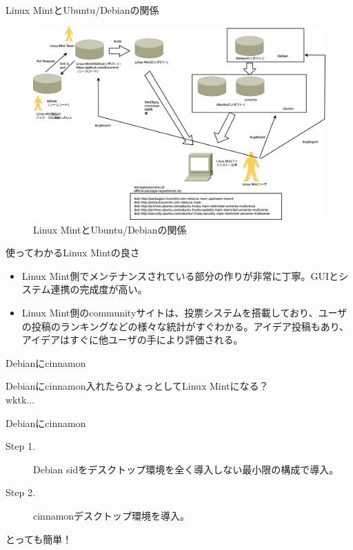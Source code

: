 \begin{frame}{Linux MintとUbuntu/Debianの関係}

\begin{figure}[H]
\centering
\includegraphics[width=0.7\hsize]{image201412/mint-construct.eps}
\caption{Linux MintとUbuntu/Debianの関係}
\end{figure}
  
\end{frame}

\begin{frame}{使ってわかるLinux Mintの良さ}

\begin{itemize}
\item Linux Mint側でメンテナンスされている部分の作りが非常に丁寧。GUIとシステム連携の完成度が高い。
 \item Linux Mint側のcommunityサイトは、投票システムを搭載しており、ユーザの投稿のランキングなどの様々な統計がすぐわかる。アイデア投稿もあり、アイデアはすぐに他ユーザの手により評価される。
\end{itemize}
\end{frame}

\begin{frame}{Debianにcinnamon}

  Debianにcinnamon入れたらひょっとしてLinux Mintになる？\\
  wktk...
 
\end{frame}  

\begin{frame}[containsverbatim]{Debianにcinnamon}

\begin{description}
\item [Step 1.] Debian sidをデスクトップ環境を全く導入しない最小限の構成で導入。
\item [Step 2.] cinnamonデスクトップ環境を導入。
\end{description}

\begin{center}
\LARGE とっても簡単！
\end{center}
\end{frame}  

